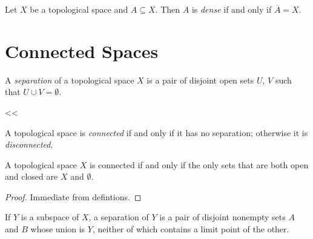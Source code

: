 \begin{definition}[Dense]
    Let $X$ be a topological space and $A \subseteq X$. Then $A$ is \emph{dense}
    if and only if $\overline{A} = X$.
\end{definition}

\section{Connected Spaces}

\begin{definition}[Separation]
    A \emph{separation} of a topological space $X$ is a pair of disjoint open sets $U$, $V$ such that $U \cup V = \emptyset$.
\end{definition}<<

\begin{definition}[Connected]
    A topological space is \emph{connected} if and only if it has no separation; otherwise it is \emph{disconnected}.
\end{definition}

\begin{proposition}
    \label{proposition:open_closed_connective}
    A topological space $X$ is connected if and only if the only sets that are both open and closed are $X$ and $\emptyset$.
\end{proposition}

\begin{proof}
    Immediate from defintions.
\end{proof}

\begin{lemma}
    \label{lemma:limit_point_separation}
    If $Y$ is a subspace of $X$, a separation of $Y$ is a pair of disjoint nonempty sets $A$ and $B$ whose union is $Y$, neither of which contains a limit point of the other.
\end{lemma}

